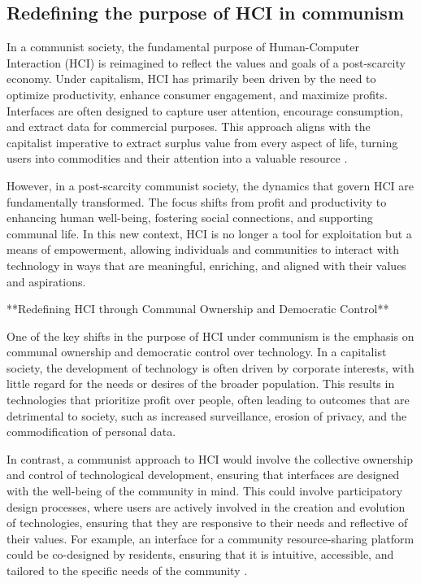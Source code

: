\subsection{Redefining the purpose of HCI in communism}

In a communist society, the fundamental purpose of Human-Computer Interaction (HCI) is reimagined to reflect the values and goals of a post-scarcity economy. Under capitalism, HCI has primarily been driven by the need to optimize productivity, enhance consumer engagement, and maximize profits. Interfaces are often designed to capture user attention, encourage consumption, and extract data for commercial purposes. This approach aligns with the capitalist imperative to extract surplus value from every aspect of life, turning users into commodities and their attention into a valuable resource \cite[pp.~243-245]{engels1884}.

However, in a post-scarcity communist society, the dynamics that govern HCI are fundamentally transformed. The focus shifts from profit and productivity to enhancing human well-being, fostering social connections, and supporting communal life. In this new context, HCI is no longer a tool for exploitation but a means of empowerment, allowing individuals and communities to interact with technology in ways that are meaningful, enriching, and aligned with their values and aspirations.

**Redefining HCI through Communal Ownership and Democratic Control**

One of the key shifts in the purpose of HCI under communism is the emphasis on communal ownership and democratic control over technology. In a capitalist society, the development of technology is often driven by corporate interests, with little regard for the needs or desires of the broader population. This results in technologies that prioritize profit over people, often leading to outcomes that are detrimental to society, such as increased surveillance, erosion of privacy, and the commodification of personal data.

In contrast, a communist approach to HCI would involve the collective ownership and control of technological development, ensuring that interfaces are designed with the well-being of the community in mind. This could involve participatory design processes, where users are actively involved in the creation and evolution of technologies, ensuring that they are responsive to their needs and reflective of their values. For example, an interface for a community resource-sharing platform could be co-designed by residents, ensuring that it is intuitive, accessible, and tailored to the specific needs of the community \cite[pp.~132-135]{lenin1920}.


